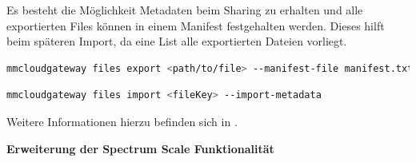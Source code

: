 Es besteht die Möglichkeit Metadaten beim Sharing zu erhalten und alle exportierten Files können in einem Manifest festgehalten werden. Dieses hilft beim späteren Import, da eine List alle exportierten Dateien vorliegt. 

\begin{lstlisting}[language=bash, caption=Export von lokalen Dateien]
mmcloudgateway files export <path/to/file> --manifest-file manifest.txt --export-metadata
\end{lstlisting}

\begin{lstlisting}[language=bash, caption=Import von COS Dateien]
mmcloudgateway files import <fileKey> --import-metadata
\end{lstlisting}

Weitere Informationen hierzu befinden sich in \cite[S. 613]{ibmadmin.2017}.

\textbf{Erweiterung der Spectrum Scale Funktionalität}\\
